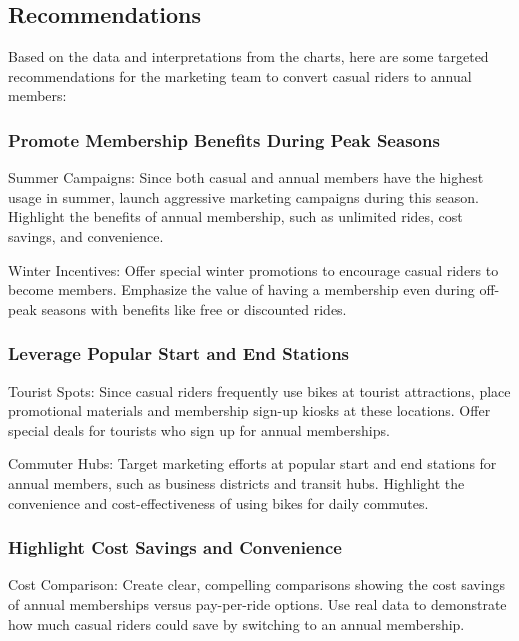\documentclass[
]{article}
\begin{document}
\subsection{Recommendations}\label{recommendations}

Based on the data and interpretations from the charts, here are some
targeted recommendations for the marketing team to convert casual riders
to annual members:

\subsubsection{Promote Membership Benefits During Peak
Seasons}\label{promote-membership-benefits-during-peak-seasons}

Summer Campaigns: Since both casual and annual members have the highest
usage in summer, launch aggressive marketing campaigns during this
season. Highlight the benefits of annual membership, such as unlimited
rides, cost savings, and convenience.

Winter Incentives: Offer special winter promotions to encourage casual
riders to become members. Emphasize the value of having a membership
even during off-peak seasons with benefits like free or discounted
rides.

\subsubsection{Leverage Popular Start and End
Stations}\label{leverage-popular-start-and-end-stations}

Tourist Spots: Since casual riders frequently use bikes at tourist
attractions, place promotional materials and membership sign-up kiosks
at these locations. Offer special deals for tourists who sign up for
annual memberships.

Commuter Hubs: Target marketing efforts at popular start and end
stations for annual members, such as business districts and transit
hubs. Highlight the convenience and cost-effectiveness of using bikes
for daily commutes.

\subsubsection{Highlight Cost Savings and
Convenience}\label{highlight-cost-savings-and-convenience}

Cost Comparison: Create clear, compelling comparisons showing the cost
savings of annual memberships versus pay-per-ride options. Use real data
to demonstrate how much casual riders could save by switching to an
annual membership.
\end{document}
